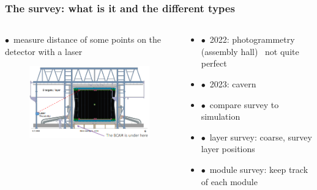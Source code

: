 \documentclass[aspectratio=1610, 12pt, xcolor=dvipsnames]{beamer}
\begin{document}
\begin{frame}\frametitle{The survey: what is it and the different types}
  \begin{columns}
    \begin{column}[c]{0.48\textwidth}
      $\bullet$\, measure distance of some points on the detector with a laser
      \begin{figure}
        \centering
        \includegraphics[width=\textwidth]{logos/survey.png}
      \end{figure}
    \end{column}
    \begin{column}[c]{0.48\textwidth}
      \begin{itemize}
        \item $\bullet$\, 2022: photogrammetry (assembly hall) \to\, not quite perfect
        \item $\bullet$\, 2023: cavern
        \item $\bullet$\, compare survey to simulation
        \item $\bullet$\, layer survey: coarse, survey layer positions
        \item $\bullet$\, module survey: keep track of each module
      \end{itemize}
    \end{column}
  \end{columns}
\end{frame}
\end{document}
